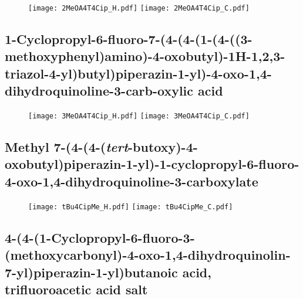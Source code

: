 \begin{figure}[H]
	\centering
		\texttt{[image: 2MeOA4T4Cip\_H.pdf]}
		\texttt{[image: 2MeOA4T4Cip\_C.pdf]}
\end{figure}

\subsection{1\hyp{}Cyclopropyl\hyp{}6\hyp{}fluoro\hyp{}7\hyp{}(4\hyp{}(4\hyp{}(1\hyp{}(4\hyp{}((3\hyp{}methoxyphenyl)amino)\hyp{}4\hyp{}oxobutyl)\hyp{}1H\hyp{}1,2,3\hyp{}triazol\hyp{}4\hyp{}yl)butyl)piperazin\hyp{}1\hyp{}yl)\hyp{}4\hyp{}oxo\hyp{}1,4\hyp{}dihydroquinoline\hyp{}3\hyp{}carb\hyp{}oxylic acid }

\begin{figure}[H]
	\centering
		\texttt{[image: 3MeOA4T4Cip\_H.pdf]}
		\texttt{[image: 3MeOA4T4Cip\_C.pdf]}
\end{figure}

\subsection{Methyl 7\hyp{}(4\hyp{}(4\hyp{}(\textit{tert}\hyp{}butoxy)\hyp{}4\hyp{}oxobutyl)piperazin\hyp{}1\hyp{}yl)\hyp{}1\hyp{}cyclopropyl\hyp{}6\hyp{}fluoro\hyp{}4\hyp{}oxo\hyp{}1,4\hyp{}dihydroquinoline\hyp{}3\hyp{}carboxylate }

\begin{figure}[H]
	\centering
		\texttt{[image: tBu4CipMe\_H.pdf]}
		\texttt{[image: tBu4CipMe\_C.pdf]}
\end{figure}

\subsection{4\hyp{}(4\hyp{}(1\hyp{}Cyclopropyl\hyp{}6\hyp{}fluoro\hyp{}3\hyp{}(methoxycarbonyl)\hyp{}4\hyp{}oxo\hyp{}1,4\hyp{}dihydroquinolin\hyp{}7\hyp{}yl)piperazin\hyp{}1\hyp{}yl)butanoic acid, trifluoroacetic acid salt }

